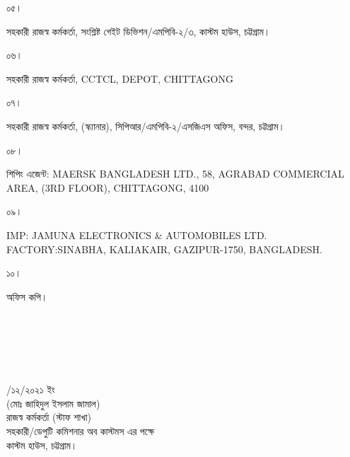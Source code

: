 \documentclass[12pt]{article}
\newcommand{\rdepo}{CCTCL, DEPOT, CHITTAGONG}
\newcommand{\jeal}{JAMUNA ELECTRONICS \& AUTOMOBILES LTD.}
\newcommand{\jeala}{SINABHA, KALIAKAIR, GAZIPUR-1750, BANGLADESH.}
\newcommand{\impn}{\jeal}
\newcommand{\impadd}{\jeala}
\newcommand{\san}{MAERSK BANGLADESH LTD.}
\newcommand{\sad}{58, AGRABAD COMMERCIAL AREA, (3RD FLOOR), CHITTAGONG, 4100}
\newcommand{\robdt}{\hspace{2.0em}/১২/২০২১ ইং}
\begin{document}
\begin{minipage}[t]{0.06\linewidth}
\scriptsize{০৫।}
\end{minipage}
\begin{minipage}[t]{0.94\linewidth}
\scriptsize{সহকারী রাজস্ব কর্মকর্তা, সংশ্লিষ্ট গেইট ডিভিশন/এমপিবি-২/৩, কাস্টম হাউস, চট্টগ্রাম।}
\end{minipage}
\begin{minipage}[t]{0.06\linewidth}
\scriptsize{০৬।}
\end{minipage}
\begin{minipage}[t]{0.94\linewidth}
\scriptsize{সহকারী রাজস্ব কর্মকর্তা, {\rdepo}}
\end{minipage}
\begin{minipage}[t]{0.06\linewidth}
\scriptsize{০৭।}
\end{minipage}
\begin{minipage}[t]{0.94\linewidth}
\scriptsize{সহকারী রাজস্ব কর্মকর্তা, (স্ক্যানার), সিপিআর/এমপিবি-২/এসজিএস অফিস, বন্দর, চট্টগ্রাম।}
\end{minipage}
\begin{minipage}[t]{0.06\linewidth}
\scriptsize{০৮।}
\end{minipage}
\begin{minipage}[t]{0.94\linewidth}
\scriptsize{শিপিং এজেন্ট:
{\san}, {\sad}}
\end{minipage}
\begin{minipage}[t]{0.06\linewidth}
\scriptsize{০৯।}
\end{minipage}
\begin{minipage}[t]{0.94\linewidth}
\scriptsize{IMP: {\impn}
FACTORY:{\impadd}}
\end{minipage}
\begin{minipage}[t]{0.06\linewidth}
\scriptsize{১০।}
\end{minipage}
\begin{minipage}[t]{0.94\linewidth}
\scriptsize{অফিস কপি।}
\\
\\
\\
\\
\\
\\
\end{minipage}
\begin{minipage}[t]{0.60\linewidth}
\hspace{1em}
\end{minipage}
\begin{minipage}[t]{0.40\linewidth}
\begin{center}
\scriptsize{{\robdt}}
\\
\footnotesize{(মোঃ জাহিদুল ইসলাম জামাল)}
\\
\footnotesize{রাজস্ব কর্মকর্তা (স্টাফ শাখা)}
\\
\scriptsize{সহকারী/ডেপুটি কমিশনার অব কাস্টমস এর পক্ষে}
\\
\scriptsize{কাস্টম হাউস, চট্টগ্রাম।}
\end{center}
\end{minipage}
\end{document}
